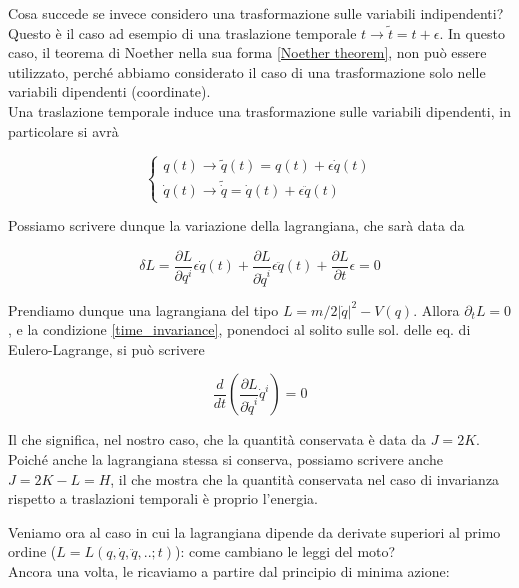 \documentclass{report}
\begin{document}
\begin{example}
    Cosa succede se invece considero una trasformazione sulle variabili indipendenti? Questo è il caso ad esempio di una traslazione temporale $t \rightarrow \tilde{t} = t + \epsilon$. In questo caso, il teorema di Noether nella sua forma \ref{Noether theorem}, non può essere utilizzato, perché abbiamo considerato il caso di una trasformazione solo nelle variabili dipendenti (coordinate).  \\

    Una traslazione temporale induce una trasformazione sulle variabili dipendenti, in particolare si avrà 

        \[
    \begin{cases}
    q(t) \rightarrow \tilde{q}(t) = q(t) + \epsilon \dot{q}(t)   \\
    \dot{q}(t) \rightarrow \tilde{\dot{q}} = \dot{q}(t) + \epsilon\ddot{q}(t)
    \end{cases}
    \]

    Possiamo scrivere dunque la variazione della lagrangiana, che sarà data da 

    \begin{equation}
        \label{time_invariance}
        \delta L = \frac{\partial L }{\partial q^i}\epsilon \dot{q}(t) + \frac{\partial L }{\partial \dot{q}^i}\epsilon \ddot{q}(t) + \frac{\partial L }{\partial t}\epsilon = 0 
    \end{equation}

    Prendiamo dunque una lagrangiana del tipo $L = m/2|\dot{q}|^2 - V(q)$. Allora $\partial_t L= 0$, e la condizione \ref{time_invariance}, ponendoci al solito sulle sol. delle eq. di Eulero-Lagrange, si può scrivere 

    \begin{equation}
        \frac{d}{dt}\left(\frac{\partial L }{\partial \dot{q}^i} \dot{q}^i\right) = 0 
    \end{equation}

    Il che significa, nel nostro caso, che la quantità conservata è data da $J = 2K$. Poiché anche la lagrangiana stessa si conserva, possiamo scrivere anche $J = 2K - L = H $, il che mostra che la quantità conservata nel caso di invarianza rispetto a traslazioni temporali è proprio l'energia. 
    
\end{example}

Veniamo ora al caso in cui la lagrangiana dipende da derivate superiori al primo ordine ($L = L(q, \dot{q}, \ddot{q}, ..; t)$): come cambiano le leggi del moto? \\
Ancora una volta, le ricaviamo a partire dal principio di minima azione: 
\end{document}
